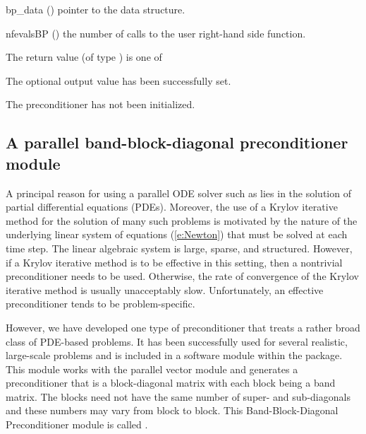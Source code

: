 {
  \begin{args}[nfevalsBP]
  \item[bp\_data] ()
    pointer to the {\cvbandpre} data structure.
  \item[nfevalsBP] ()
    the number of calls to the user right-hand side function.
  \end{args}
}
{
  The return value  (of type ) is one of
  \begin{args}
  \item[\Id{CV\_SUCCESS}] 
    The optional output value has been successfully set.
  \item[\Id{CV\_PDATA\_NULL}]
    The {\cvbandpre} preconditioner has not been initialized.
  \end{args}
}
{}

\subsection{A parallel band-block-diagonal preconditioner module}
\label{sss:cvbbdpre}

A principal reason for using a parallel ODE solver such as {\cvode} lies
in the solution of partial differential equations (PDEs).  Moreover,
the use of a Krylov iterative method for the solution of many such
problems is motivated by the nature of the underlying linear system of
equations (\ref{e:Newton}) that must be solved at each time step.  The
linear algebraic system is large, sparse, and structured. However, if
a Krylov iterative method is to be effective in this setting, then a
nontrivial preconditioner needs to be used.  Otherwise, the rate of
convergence of the Krylov iterative method is usually unacceptably
slow.  Unfortunately, an effective preconditioner tends to be
problem-specific.

However, we have developed one type of preconditioner that treats a
rather broad class of PDE-based problems.  It has been successfully
used for several realistic, large-scale problems \cite{HiTa:98} and is
included in a software module within the {\cvode} package. This module
works with the parallel vector module {\nvecp} and 
generates a preconditioner that is a block-diagonal matrix with each
block being a band matrix. The blocks need not have the same number of
super- and sub-diagonals and these numbers may vary from block to
block. This Band-Block-Diagonal Preconditioner module is called
{\cvbbdpre}.

